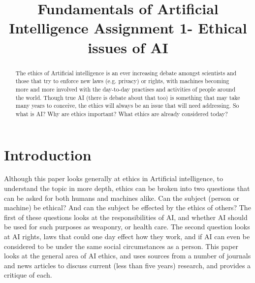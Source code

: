 \documentclass[article]{IEEEtran}
\begin{document}
\title{Fundamentals of Artificial Intelligence Assignment 1- Ethical issues of AI}

\author{
}

\maketitle

\begin{abstract}
The ethics of Artificial intelligence is an ever increasing debate amongst scientists and those that try to enforce new laws (e.g. privacy) or rights, with machines becoming more and more involved with the day-to-day practises and activities of people around the world. Though true AI (there is debate about that too) is something that may take many years to conceive, the ethics will always be an issue that will need addressing. So what is AI? Why are ethics important? What ethics are already considered today?
\end{abstract}

\section{Introduction}
Although this paper looks generally at ethics in Artificial intelligence, to understand the topic in more depth, ethics can be broken into two questions that can be asked for both humans and machines alike. Can the subject (person or machine) be ethical? And can the subject be effected by the ethics of others? The first of these questions looks at the responsibilities of AI, and whether AI should be used for such purposes as weaponry, or health care. The second question looks at AI rights, laws that could one day effect how they work, and if AI can even be considered to be under the same social circumstances as a person. This paper looks at the general area of AI ethics, and uses sources from a number of journals and news articles to discuss current (less than five years) research, and provides a critique of each.
\end{document}
